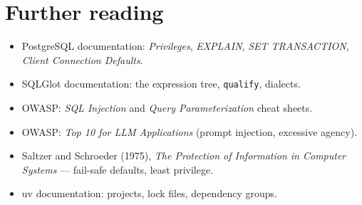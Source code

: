 \documentclass[11pt,a4paper]{article}
\begin{document}
\section{Further reading}

\begin{itemize}[leftmargin=*]
  \item PostgreSQL documentation: \emph{Privileges}, \emph{EXPLAIN},
        \emph{SET TRANSACTION}, \emph{Client Connection Defaults}.
  \item SQLGlot documentation: the expression tree, \texttt{qualify},
        dialects.
  \item OWASP: \emph{SQL Injection} and \emph{Query Parameterization} cheat
        sheets.
  \item OWASP: \emph{Top 10 for LLM Applications} (prompt injection,
        excessive agency).
  \item Saltzer and Schroeder (1975), \emph{The Protection of Information in
        Computer Systems} --- fail-safe defaults, least privilege.
  \item uv documentation: projects, lock files, dependency groups.
\end{itemize}
\end{document}
